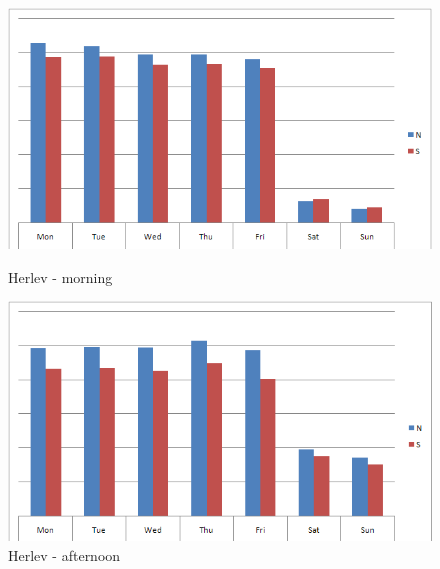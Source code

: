 \begin{figure}[ht]

    \begin{minipage}[b]{0.5\linewidth}

\centering
\includegraphics[scale=0.25]{herlev_direction_proportions_morning.png} 
\caption{Herlev - morning}
\label{fig:herlev_props_morning}

    \end{minipage}
    \hspace{0.5cm}
    \begin{minipage}[b]{0.5\linewidth}

\centering
\includegraphics[scale=0.25]{herlev_direction_proportions_afternoon.png} 
\caption{Herlev - afternoon}
\label{fig:herlev_props_afternoon}

    \end{minipage}

\end{figure}

